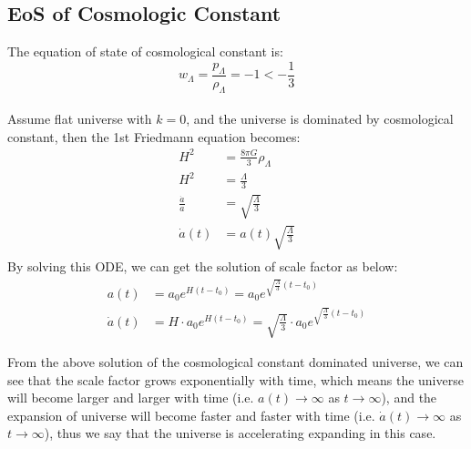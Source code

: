 \clearpage
\subsection{EoS of Cosmologic Constant}
\begin{theory}
    The equation of state of cosmological constant is:
    \[
        w_\Lambda = \frac{p_\Lambda}{\rho_\Lambda} = -1 < -\frac{1}{3}
    \] \\

    Assume flat universe with $k=0$, and the universe is dominated by cosmological constant, then the 1st Friedmann equation becomes:
    \begin{align*}
        H^2 &= \frac{8\pi G}{3}\rho_\Lambda \\
        H^2 &= \frac{\Lambda}{3} \\
        \frac{\dot{a}}{a} &= \sqrt{\frac{\Lambda}{3}} \\
        \dot{a}(t) &= a(t) \sqrt{\frac{\Lambda}{3}} \\
    \end{align*}
    By solving this ODE, we can get the solution of scale factor as below:
    \begin{align*}
        a(t) &= a_0 e^{H (t - t_0)} = a_0 e^{\sqrt{\frac{\Lambda}{3}} (t - t_0)} \\
        \dot{a}(t) &= H \cdot a_0 e^{H (t - t_0)} = \sqrt{\frac{\Lambda}{3}} \cdot a_0 e^{\sqrt{\frac{\Lambda}{3}} (t - t_0)}
    \end{align*}
\end{theory}

\bigskip \noindent
\begin{intuition}
    From the above solution of the cosmological constant dominated universe, we can see that the scale factor grows exponentially with time, which means the universe will become larger and larger with time (i.e. $a(t) \to \infty$ as $t \to \infty$), and the expansion of universe will become faster and faster with time (i.e. $\dot{a}(t) \to \infty$ as $t \to \infty$), thus we say that the universe is accelerating expanding in this case. \\
\end{intuition}


\clearpage
